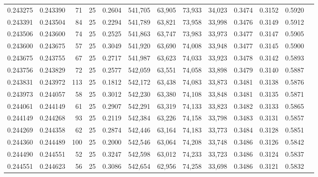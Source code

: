 \begin{tabular}{rrrrrrrrrrrrr}
0.243275 & 0.243390 &    71 &  25 &                                     0.2604 & 541,705 &  63,905 &  73,933 &  34,023 & 0.3474 & 0.3152 & 0.5920 \\
0.243391 & 0.243504 &    84 &  25 &                                     0.2294 & 541,789 &  63,821 &  73,958 &  33,998 & 0.3476 & 0.3149 & 0.5912 \\
0.243506 & 0.243600 &    74 &  25 &                                     0.2525 & 541,863 &  63,747 &  73,983 &  33,973 & 0.3477 & 0.3147 & 0.5905 \\
0.243600 & 0.243675 &    57 &  25 &                                     0.3049 & 541,920 &  63,690 &  74,008 &  33,948 & 0.3477 & 0.3145 & 0.5900 \\
0.243675 & 0.243755 &    67 &  25 &                                     0.2717 & 541,987 &  63,623 &  74,033 &  33,923 & 0.3478 & 0.3142 & 0.5893 \\
0.243756 & 0.243829 &    72 &  25 &                                     0.2577 & 542,059 &  63,551 &  74,058 &  33,898 & 0.3479 & 0.3140 & 0.5887 \\
0.243831 & 0.243972 &   113 &  25 &                                     0.1812 & 542,172 &  63,438 &  74,083 &  33,873 & 0.3481 & 0.3138 & 0.5876 \\
0.243973 & 0.244057 &    58 &  25 &                                     0.3012 & 542,230 &  63,380 &  74,108 &  33,848 & 0.3481 & 0.3135 & 0.5871 \\
0.244061 & 0.244149 &    61 &  25 &                                     0.2907 & 542,291 &  63,319 &  74,133 &  33,823 & 0.3482 & 0.3133 & 0.5865 \\
0.244149 & 0.244268 &    93 &  25 &                                     0.2119 & 542,384 &  63,226 &  74,158 &  33,798 & 0.3483 & 0.3131 & 0.5857 \\
0.244269 & 0.244358 &    62 &  25 &                                     0.2874 & 542,446 &  63,164 &  74,183 &  33,773 & 0.3484 & 0.3128 & 0.5851 \\
0.244360 & 0.244489 &   100 &  25 &                                     0.2000 & 542,546 &  63,064 &  74,208 &  33,748 & 0.3486 & 0.3126 & 0.5842 \\
0.244490 & 0.244551 &    52 &  25 &                                     0.3247 & 542,598 &  63,012 &  74,233 &  33,723 & 0.3486 & 0.3124 & 0.5837 \\
0.244551 & 0.244623 &    56 &  25 &                                     0.3086 & 542,654 &  62,956 &  74,258 &  33,698 & 0.3486 & 0.3121 & 0.5832 \\

\end{tabular}
